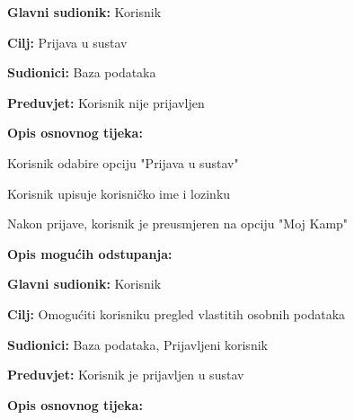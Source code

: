 					\noindent {}
					\begin{packed_item}
						
						\item \textbf{Glavni sudionik: } Korisnik
						\item  \textbf{Cilj:} Prijava u sustav
						\item  \textbf{Sudionici:} Baza podataka
						\item  \textbf{Preduvjet:} Korisnik nije prijavljen
						\item  \textbf{Opis osnovnog tijeka:}
						
						\item[] \begin{packed_enum}
							
							\item Korisnik odabire opciju "Prijava u sustav"
							\item Korisnik upisuje korisničko ime i lozinku
							\item Nakon prijave, korisnik je preusmjeren na opciju "Moj Kamp"
						
						\end{packed_enum}
						
						\item  \textbf{Opis mogućih odstupanja:}
						
						\item[] 
				
					\noindent {}
					\begin{packed_item}
						
						\item \textbf{Glavni sudionik: }Korisnik
						\item  \textbf{Cilj:} Omogućiti korisniku pregled vlastitih osobnih podataka
						\item  \textbf{Sudionici:} Baza podataka, Prijavljeni korisnik
						\item  \textbf{Preduvjet:} Korisnik je prijavljen u sustav
						\item  \textbf{Opis osnovnog tijeka:}
						

\end{packed_item}
\end{packed_item}
